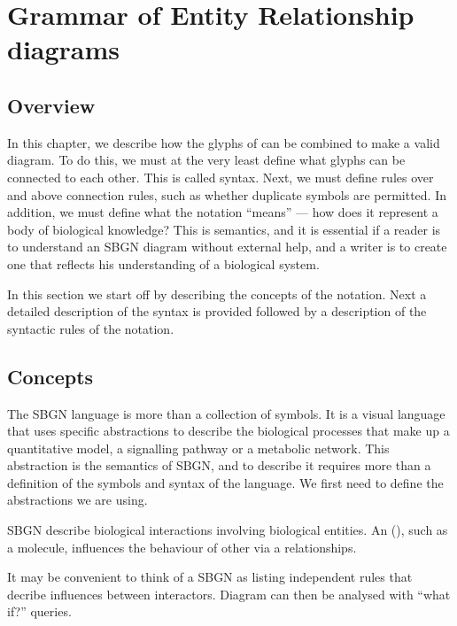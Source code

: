 \color{red}
\chapter{Grammar of Entity Relationship diagrams}
\label{chp:grammar}

\section{Overview}

In this chapter, we describe how the glyphs of \SBGNERLone can be combined
to make a valid \ER{} diagram. To do this, we must at the very least
define what glyphs can be connected to each other. This is called
syntax. Next, we must define rules over and above connection rules,
such as whether duplicate symbols are permitted. In addition, we must define what the notation ``means'' --- how does it represent a body of biological knowledge? This is semantics, and it is essential if a reader is to understand an SBGN diagram without external help, and a writer is to create one that reflects his understanding of a biological system.

In this section we start off by describing the concepts of the
\ER{} notation. Next a detailed description of the syntax is provided
followed by a description of the syntactic rules of the notation.

\section{Concepts}

The SBGN \ER{} language is more than a collection of symbols. It is a
visual language that uses specific abstractions to describe the
biological processes that make up a quantitative model, a signalling pathway or a metabolic network. This abstraction is the semantics of SBGN, and to describe it requires more than a definition
of the symbols and syntax of the language. We first need to define the
abstractions we are using.

SBGN \ERs{} describe biological interactions involving biological entities. An  (), such as a molecule, influences the behaviour of other  via a relationships. 

It may be convenient to think of a SBGN \ERs{} as listing independent rules that decribe influences between interactors. Diagram can then be analysed with ``what if?'' queries. 




\normalcolor